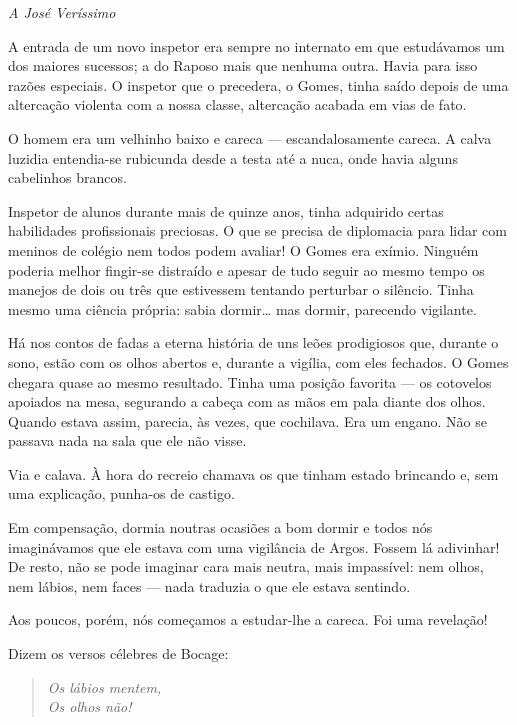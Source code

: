 
\begin{flushright}
\emph{A José Veríssimo}
\end{flushright}

\noindent{}A entrada de um novo inspetor era sempre no internato em que estudávamos
um dos maiores sucessos; a do Raposo mais que nenhuma outra. Havia para
isso razões especiais. O inspetor que o precedera, o Gomes, tinha saído
depois de uma altercação violenta com a nossa classe, altercação acabada
em vias de fato.

O homem era um velhinho baixo e careca --- escandalosamente careca. A
calva luzidia entendia-se rubicunda desde a testa até a nuca, onde havia
alguns cabelinhos brancos.

Inspetor de alunos durante mais de quinze anos, tinha adquirido certas
habilidades profissionais preciosas. O que se precisa de diplomacia para
lidar com meninos de colégio nem todos podem avaliar! O Gomes era
exímio. Ninguém poderia melhor fingir-se distraído e apesar de tudo
seguir ao mesmo tempo os manejos de dois ou três que estivessem tentando
perturbar o silêncio. Tinha mesmo uma ciência própria: sabia dormir\ldots{}
mas dormir, parecendo vigilante.

Há nos contos de fadas a eterna história de uns leões prodigiosos que,
durante o sono, estão com os olhos abertos e, durante a vigília, com
eles fechados. O Gomes chegara quase ao mesmo resultado. Tinha uma
posição favorita --- os cotovelos apoiados na mesa, segurando a cabeça
com as mãos em pala diante dos olhos. Quando estava assim, parecia, às
vezes, que cochilava. Era um engano. Não se passava nada na sala que ele
não visse.

Via e calava. À hora do recreio chamava os que tinham estado brincando
e, sem uma explicação, punha-os de castigo.

Em compensação, dormia noutras ocasiões a bom dormir e todos nós
imaginávamos que ele estava com uma vigilância de Argos. Fossem lá
adivinhar! De resto, não se pode imaginar cara mais neutra, mais
impassível: nem olhos, nem lábios, nem faces --- nada traduzia o que ele
estava sentindo.

Aos poucos, porém, nós começamos a estudar-lhe a careca. Foi uma
revelação!

Dizem os versos célebres de Bocage:

\begin{verse}
\emph{Os lábios mentem,}\\
\emph{Os olhos não!}
\end{verse}

